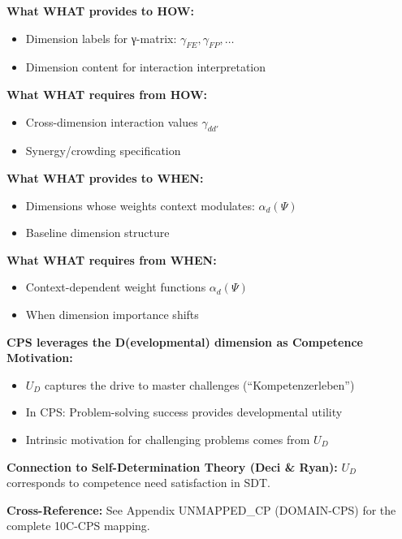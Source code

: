 \begin{tcolorbox}[colback=yellow!5!white, colframe=yellow!75!black,
    title=Integration: CORE-WHAT $\leftrightarrow$ CORE-HOW]
\textbf{What WHAT provides to HOW:}
\begin{itemize}[nosep]
\item Dimension labels for γ-matrix: $\gamma_{FE}, \gamma_{FP}, \ldots$
\item Dimension content for interaction interpretation
\end{itemize}

\textbf{What WHAT requires from HOW:}
\begin{itemize}[nosep]
\item Cross-dimension interaction values $\gamma_{dd'}$
\item Synergy/crowding specification
\end{itemize}
\end{tcolorbox}

\begin{tcolorbox}[colback=yellow!5!white, colframe=yellow!75!black,
    title=Integration: CORE-WHAT $\leftrightarrow$ CORE-WHEN]
\textbf{What WHAT provides to WHEN:}
\begin{itemize}[nosep]
\item Dimensions whose weights context modulates: $\alpha_d(\Psi)$
\item Baseline dimension structure
\end{itemize}

\textbf{What WHAT requires from WHEN:}
\begin{itemize}[nosep]
\item Context-dependent weight functions $\alpha_d(\Psi)$
\item When dimension importance shifts
\end{itemize}
\end{tcolorbox}

\begin{tcolorbox}[colback=green!5!white, colframe=green!75!black,
    title=Application Domain: Complex Problem Solving (CP)]
\textbf{CPS leverages the D(evelopmental) dimension as Competence Motivation:}
\begin{itemize}[nosep]
\item $U_D$ captures the drive to master challenges (``Kompetenzerleben'')
\item In CPS: Problem-solving success provides developmental utility
\item Intrinsic motivation for challenging problems comes from $U_D$
\end{itemize}

\textbf{Connection to Self-Determination Theory (Deci \& Ryan):}
$U_D$ corresponds to competence need satisfaction in SDT.

\textbf{Cross-Reference:} See Appendix UNMAPPED_CP (DOMAIN-CPS) for the complete 10C-CPS mapping.
\end{tcolorbox}


